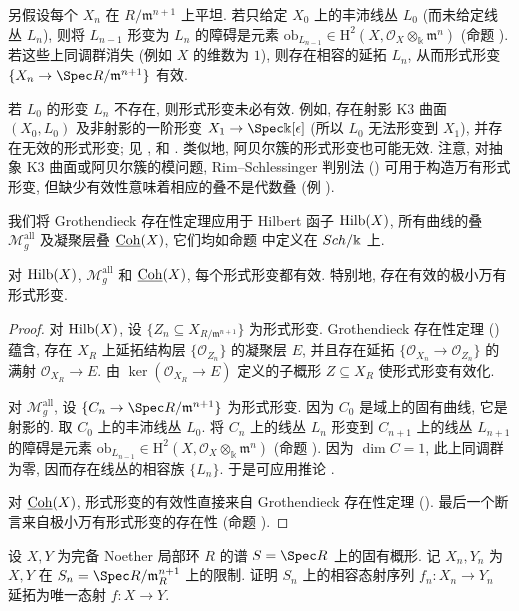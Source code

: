 \begin{remark}\label{src:C.5.9}
另假设每个 $X_n$ 在 $R/\mathfrak m^{n+1}$ 上平坦. 若只给定 $X_0$ 上的丰沛线丛 $L_0$ (而未给定线丛 $L_n$), 则将 $L_{n-1}$ 形变为 $L_n$ 的障碍是元素 $\mathrm{ob}_{L_{n-1}}\in\mathrm H^2(X,\mathcal O_X\otimes_{\Bbbk}\mathfrak m^n)$ (命题 ). 若这些上同调群消失 (例如 $X$ 的维数为 $1$), 则存在相容的延拓 $L_n$, 从而形式形变 $\{X_n\to\Spec R/\mathfrak m^{n+1}\}$ 有效.

若 $L_0$ 的形变 $L_n$ 不存在, 则形式形变未必有效. 例如, 存在射影 K3 曲面 $(X_0,L_0)$ 及非射影的一阶形变 $X_1\to\Spec\Bbbk[\epsilon]$ (所以 $L_0$ 无法形变到 $X_1$), 并存在无效的形式形变; 见 \cite[例 $21.2.1$]{Har10}, \cite[断言 $3.5$]{Sta06} 和 \cite[Tag 0D1Q]{SP}. 类似地, 阿贝尔簇的形式形变也可能无效. 注意, 对抽象 K3 曲面或阿贝尔簇的模问题, Rim--Schlessinger 判别法 () 可用于构造万有形式形变, 但缺少有效性意味着相应的叠不是代数叠 (例 ).
\end{remark}
我们将 Grothendieck 存在性定理应用于 Hilbert 函子 $\operatorname{Hilb}(X)$, 所有曲线的叠 $\mathcal M_g^{\mathrm{all}}$ 及凝聚层叠 $\underline{\mathrm{Coh}}(X)$, 它们均如命题  中定义在 $Sch/\Bbbk$ 上.
\begin{proposition}\label{src:C.5.10}
对 $\operatorname{Hilb}(X)$, $\mathcal M_g^{\mathrm{all}}$ 和 $\underline{\mathrm{Coh}}(X)$, 每个形式形变都有效. 特别地, 存在有效的极小万有形式形变.
\end{proposition}
\begin{proof}
对 $\operatorname{Hilb}(X)$, 设 $\{Z_n\subseteq X_{R/\mathfrak m^{n+1}}\}$ 为形式形变. Grothendieck 存在性定理 () 蕴含, 存在 $X_R$ 上延拓结构层 $\{\mathcal O_{Z_n}\}$ 的凝聚层 $E$, 并且存在延拓 $\{\mathcal O_{X_n}\to\mathcal O_{Z_n}\}$ 的满射 $\mathcal O_{X_R}\to E$. 由 $\ker(\mathcal O_{X_R}\to E)$ 定义的子概形 $Z\subseteq X_R$ 使形式形变有效化.

对 $\mathcal M_g^{\mathrm{all}}$, 设 $\{C_n\to\Spec R/\mathfrak m^{n+1}\}$ 为形式形变. 因为 $C_0$ 是域上的固有曲线, 它是射影的. 取 $C_0$ 上的丰沛线丛 $L_0$. 将 $C_n$ 上的线丛 $L_n$ 形变到 $C_{n+1}$ 上的线丛 $L_{n+1}$ 的障碍是元素 $\mathrm{ob}_{L_{n-1}}\in\mathrm H^2(X,\mathcal O_X\otimes_{\Bbbk}\mathfrak m^n)$ (命题 ). 因为 $\dim C=1$, 此上同调群为零, 因而存在线丛的相容族 $\{L_n\}$. 于是可应用推论 .

对 $\underline{\mathrm{Coh}}(X)$, 形式形变的有效性直接来自 Grothendieck 存在性定理 (). 最后一个断言来自极小万有形式形变的存在性 (命题 ).
\end{proof}
\begin{exercise}\label{src:C.5.11}
设 $X,Y$ 为完备 Noether 局部环 $R$ 的谱 $S=\Spec R$ 上的固有概形. 记 $X_n,Y_n$ 为 $X,Y$ 在 $S_n=\Spec R/\mathfrak m_R^{n+1}$ 上的限制. 证明 $S_n$ 上的相容态射序列 $f_n:X_n\to Y_n$ 延拓为唯一态射 $f:X\to Y$.
\end{exercise}
